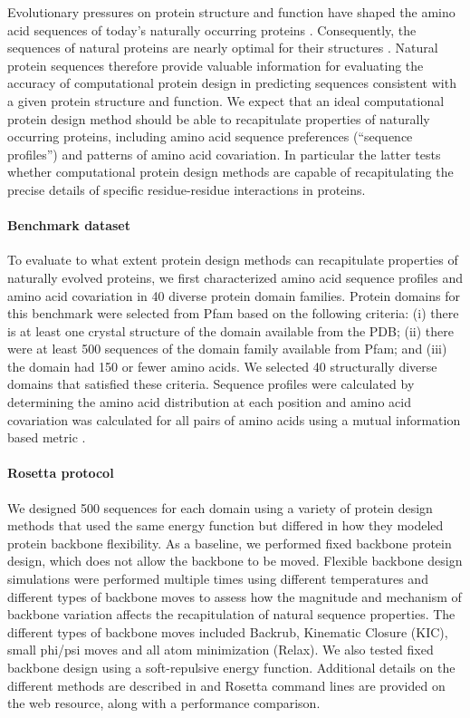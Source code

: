 Evolutionary pressures on protein structure and function have shaped the amino acid sequences of today's naturally occurring proteins \cite{dokholyan_understanding_2001}. Consequently, the sequences of natural proteins are nearly optimal for their structures \cite{kuhlman_native_2000}. Natural protein sequences therefore provide valuable information for evaluating the accuracy of computational protein design in predicting sequences consistent with a given protein structure and function. We expect that an ideal computational protein design method should be able to recapitulate properties of naturally occurring proteins, including amino acid sequence preferences (``sequence profiles'') and patterns of amino acid covariation. In particular the latter tests whether computational protein design methods are capable of recapitulating the precise details of specific residue-residue interactions in proteins.

\paragraph{Benchmark dataset}

To evaluate to what extent protein design methods can recapitulate properties of naturally evolved proteins, we first characterized amino acid sequence profiles and amino acid covariation in 40 diverse protein domain families. Protein domains for this benchmark were selected from Pfam \cite{finn_pfam:_2014} based on the following criteria: (i) there is at least one crystal structure of the domain available from the PDB; (ii) there were at least 500 sequences of the domain family available from Pfam; and (iii) the domain had 150 or fewer amino acids. We selected 40 structurally diverse domains that satisfied these criteria. Sequence profiles were calculated by determining the amino acid distribution at each position and amino acid covariation was calculated for all pairs of amino acids using a mutual information based metric \cite{dickson_identifying_2010}.

\paragraph{Rosetta protocol}

We designed 500 sequences for each domain using a variety of protein design methods that used the same energy function but differed in how they modeled protein backbone flexibility. As a baseline, we performed fixed backbone protein design, which does not allow the backbone to be moved. Flexible backbone design simulations were performed multiple times using different temperatures and different types of backbone moves to assess how the magnitude and mechanism of backbone variation affects the recapitulation of natural sequence properties. The different types of backbone moves included Backrub, Kinematic Closure (KIC), small phi/psi moves and all atom minimization (Relax). We also tested fixed backbone design using a soft-repulsive energy function. Additional details on the different methods are described in \cite{ollikainen_computational_2013} and Rosetta command lines are provided on the web resource, along with a performance comparison.


